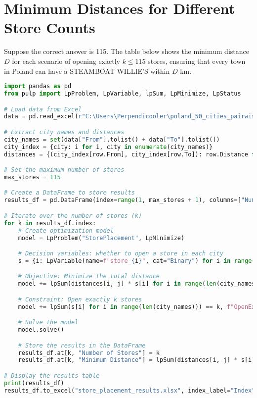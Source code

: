 \section*{ Minimum Distances for Different Store Counts}

Suppose the correct answer is 115. The table below shows the minimum distance $D$ for each scenario of opening exactly $k \leq 115$ stores, ensuring that every town in Poland can have a STEAMBOAT WILLIE'S within $D$ km.
\begin{center}
    \begin{lstlisting}[language=Python, caption=Minimum Resturent we need to open]
        import pandas as pd
from pulp import LpProblem, LpVariable, lpSum, LpMinimize, LpStatus

# Load data from Excel
data = pd.read_excel(r"C:\Users\Perpendicooler\poland_50_cities_pairwise_distances.xlsx")  

# Extract city names and distances
city_names = set(data["From"].tolist() + data["To"].tolist())
city_index = {city: i for i, city in enumerate(city_names)}
distances = {(city_index[row.From], city_index[row.To]): row.Distance for row in data.itertuples()}

# Set the maximum number of stores
max_stores = 115

# Create a DataFrame to store results
results_df = pd.DataFrame(index=range(1, max_stores + 1), columns=["Number of Stores", "Minimum Distance"])

# Iterate over the number of stores (k)
for k in results_df.index:
    # Create optimization model
    model = LpProblem("StorePlacement", LpMinimize)

    # Decision variables: whether to open a store in each city
    s = {i: LpVariable(name=f"store_{i}", cat="Binary") for i in range(len(city_names))}

    # Objective: Minimize the total distance
    model += lpSum(distances[i, j] * s[i] for i in range(len(city_names)) for j in range(len(city_names)) if (i, j) in distances), "Minimize Distance"

    # Constraint: Open exactly k stores
    model += lpSum(s[i] for i in range(len(city_names))) == k, f"OpenExactly_{k}_Stores"

    # Solve the model
    model.solve()

    # Store the results in the DataFrame
    results_df.at[k, "Number of Stores"] = k
    results_df.at[k, "Minimum Distance"] = lpSum(distances[i, j] * s[i].value() for i in range(len(city_names)) for j in range(len(city_names)) if (i, j) in distances).value()

# Display the results table
print(results_df)
results_df.to_excel("store_placement_results.xlsx", index_label="Index")

    \end{lstlisting}
\end{center}


